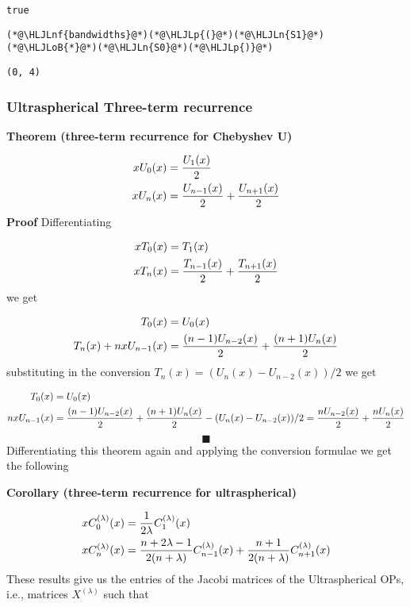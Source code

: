 \documentclass[12pt,landscape]{article}
\newcommand{\HLJLn}[1]{#1}
\newcommand{\HLJLnf}[1]{\textcolor[RGB]{66,102,213}{#1}}
\newcommand{\HLJLoB}[1]{\textcolor[RGB]{102,102,102}{\textbf{#1}}}
\newcommand{\HLJLp}[1]{#1}
\begin{document}
{\begin{lstlisting}
true
\end{lstlisting}


\begin{lstlisting}
(*@\HLJLnf{bandwidths}@*)(*@\HLJLp{(}@*)(*@\HLJLn{S1}@*)(*@\HLJLoB{*}@*)(*@\HLJLn{S0}@*)(*@\HLJLp{)}@*)
\end{lstlisting}

\begin{lstlisting}
(0, 4)
\end{lstlisting}


\subsubsection{Ultraspherical Three-term recurrence}
\textbf{Theorem (three-term recurrence for Chebyshev U)}


\begin{align*}
x U_0(x) &= {U_1(x) \over 2} \\
x U_n(x) &= {U_{n-1}(x) \over 2} + {U_{n+1}(x) \over 2}
\end{align*}
\textbf{Proof} Differentiating


\begin{align*}
 x T_0(x) &= T_1(x) \\
x T_n(x)  &=  {T_{n-1}(x) \over 2} + {T_{n+1}(x) \over 2}
\end{align*}
we get


\begin{align*}
  T_0(x) &= U_0(x) \\
 T_n(x) + n x U_{n-1}(x)  &=  {(n-1) U_{n-2}(x) \over 2} + {(n+1) U_n(x) \over 2}
\end{align*}
substituting in the conversion $T_n(x) = (U_n(x) - U_{n-2}(x))/2$ we get


\begin{align*}
  T_0(x) &= U_0(x) \\
 n x U_{n-1}(x)  &=  {(n-1) U_{n-2}(x) \over 2} + {(n+1) U_n(x) \over 2} - (U_n(x) - U_{n-2}(x))/2 = {n U_{n-2}(x) \over 2} + {n U_n(x) \over 2}
\end{align*}
\[
\blacksquare
\]
Differentiating this theorem again and applying the conversion formulae we get the following

\textbf{Corollary (three-term recurrence for ultraspherical)}


\begin{align*}
x C_0^{(\lambda)}(x) &= {1 \over 2\lambda } C_1^{(\lambda)}(x) \\
 x C_n^{(\lambda)}(x) &=  {n+2\lambda-1 \over 2(n+\lambda)} C_{n-1}^{(\lambda)}(x) + {n+1 \over 2(n+\lambda)} C_{n+1}^{(\lambda)}(x)
\end{align*}
These results give us the entries of the Jacobi matrices of the Ultraspherical OPs, i.e., matrices $X^{(\lambda)}$ such that

}
\end{document}

